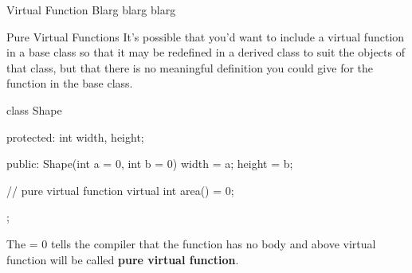 \documentclass[../lecture5-objectorientation.tex]{subfiles}
\begin{document}

\begin{frame}[fragile]{Virtual Function}
    Blarg blarg blarg
\end{frame}


\begin{frame}[fragile]{Pure Virtual Functions}
    It's possible that you'd want to include a virtual function in a base class so that it may be redefined in a derived class to suit the objects of that class, but that there is no meaningful definition you could give for the function in the base class. \newline

    \begin{cppcode}[lastline=16]
class Shape
{
    protected:
        int width, height;

    public:
        Shape(int a = 0, int b = 0)
        {
            width = a;
            height = b;
        }

        // pure virtual function
        virtual int area() = 0;
};
    \end{cppcode} \newline

    The = 0 tells the compiler that the function has no body and above virtual function will be called \textbf{pure virtual function}.
\end{frame}

\end{document}
